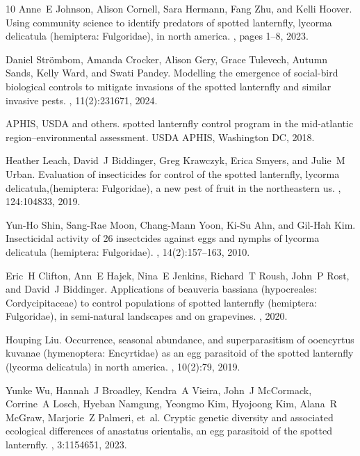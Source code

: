 \documentclass[onecolumn]{article}
\providecommand{\uppercase}[1]{\MakeUppercase{#1}}
\begin{document}
{\begin{thebibliography}{10}
Anne~E Johnson, Alison Cornell, Sara Hermann, Fang Zhu, and Kelli Hoover.
\newblock Using community science to identify predators of spotted lanternfly, lycorma delicatula (hemiptera: Fulgoridae), in north america.
, pages 1--8, 2023.

Daniel Str{\"o}mbom, Amanda Crocker, Alison Gery, Grace Tulevech, Autumn Sands, Kelly Ward, and Swati Pandey.
\newblock Modelling the emergence of social-bird biological controls to mitigate invasions of the spotted lanternfly and similar invasive pests.
, 11(2):231671, 2024.

\uppercase{A}\uppercase{P}\uppercase{H}\uppercase{I}\uppercase{S}, \uppercase{U}\uppercase{S}\uppercase{D}\uppercase{A} and others. spotted lanternfly control program in the mid-atlantic region--environmental assessment. \uppercase{U}\uppercase{S}\uppercase{D}\uppercase{A} \uppercase{A}\uppercase{P}\uppercase{H}\uppercase{I}\uppercase{S}, \uppercase{W}ashington \uppercase{D}\uppercase{C}, 2018.

Heather Leach, David~J Biddinger, Greg Krawczyk, Erica Smyers, and Julie~M Urban.
\newblock Evaluation of insecticides for control of the spotted lanternfly, lycorma delicatula,(hemiptera: Fulgoridae), a new pest of fruit in the northeastern us.
, 124:104833, 2019.

Yun-Ho Shin, Sang-Rae Moon, Chang-Mann Yoon, Ki-Su Ahn, and Gil-Hah Kim.
\newblock Insecticidal activity of 26 insectcides against eggs and nymphs of lycorma delicatula (hemiptera: Fulgoridae).
, 14(2):157--163, 2010.

Eric~H Clifton, Ann~E Hajek, Nina~E Jenkins, Richard~T Roush, John~P Rost, and David~J Biddinger.
\newblock Applications of beauveria bassiana (hypocreales: Cordycipitaceae) to control populations of spotted lanternfly (hemiptera: Fulgoridae), in semi-natural landscapes and on grapevines.
, 2020.

Houping Liu.
\newblock Occurrence, seasonal abundance, and superparasitism of ooencyrtus kuvanae (hymenoptera: Encyrtidae) as an egg parasitoid of the spotted lanternfly (lycorma delicatula) in north america.
, 10(2):79, 2019.

Yunke Wu, Hannah~J Broadley, Kendra~A Vieira, John~J McCormack, Corrine~A Losch, Hyeban Namgung, Yeongmo Kim, Hyojoong Kim, Alana~R McGraw, Marjorie~Z Palmeri, et~al.
\newblock Cryptic genetic diversity and associated ecological differences of anastatus orientalis, an egg parasitoid of the spotted lanternfly.
, 3:1154651, 2023.


\end{thebibliography}}
\end{document}
